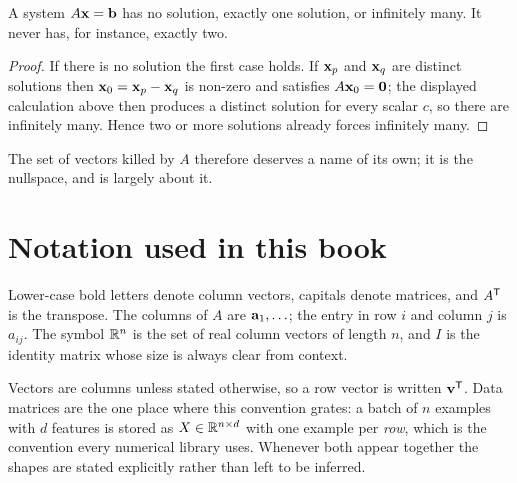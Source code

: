 \begin{theorem}
A system \(A\mathbf{x}=\mathbf{b}\) has no solution, exactly one solution, or
infinitely many. It never has, for instance, exactly two.
\end{theorem}

\begin{proof}
If there is no solution the first case holds. If \(\mathbf{x}_p\) and
\(\mathbf{x}_q\) are distinct solutions then \(\mathbf{x}_0=\mathbf{x}_p-\mathbf{x}_q\)
is non-zero and satisfies \(A\mathbf{x}_0=\mathbf{0}\); the displayed calculation
above then produces a distinct solution for every scalar \(c\), so there are
infinitely many. Hence two or more solutions already forces infinitely many.
\end{proof}

The set of vectors killed by \(A\) therefore deserves a name of its own; it is
the nullspace, and  is largely about it.

\section{Notation used in this book}

Lower-case bold letters denote column vectors, capitals denote matrices, and
\(A^{\mathsf{T}}\) is the transpose. The columns of \(A\) are \(\mathbf{a}_1,\ldots\); the
entry in row \(i\) and column \(j\) is \(a_{ij}\). The symbol \(\mathbb{R}^{n}\) is the
set of real column vectors of length \(n\), and \(I\) is the identity matrix
whose size is always clear from context.

Vectors are columns unless stated otherwise, so a row vector is written
\(\mathbf{v}^{\mathsf{T}}\). Data matrices are the one place where this convention grates:
a batch of \(n\) examples with \(d\) features is stored as \(X\in\mathbb{R}^{n\times d}\)
with one example per \emph{row}, which is the convention every numerical library
uses. Whenever both appear together the shapes are stated explicitly rather than
left to be inferred.
